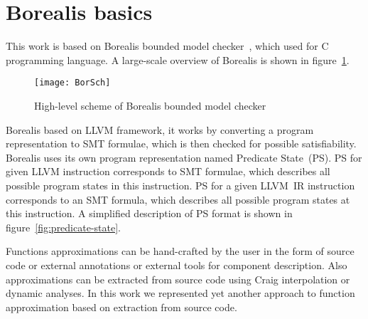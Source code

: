 \section{Borealis basics}\label{sec:basics}

This work is based on Borealis bounded model checker~\cite{Borealis}, which used for C programming language. A large-scale overview of Borealis is shown in figure~\ref{fig:borealis-scheme}.

\begin{figure}[tbh]
\centering
\caption{High-level scheme of Borealis bounded model checker}
\label{fig:borealis-scheme}
\texttt{[image: BorSch]}
\end{figure}

Borealis based on LLVM \cite{LLVM} framework, it works by converting a program representation to SMT formulae, which is then checked for possible satisfiability. Borealis uses its own program representation named Predicate State~(PS). PS for given LLVM instruction corresponds to SMT formulae, which describes all possible program states in this instruction. PS for a given LLVM~IR instruction corresponds to an SMT formula, which describes all possible program states at this instruction. A simplified description of PS format is shown in figure~\ref{fig:predicate-state}.



Functions approximations can be hand-crafted by the user in the form of source code or external annotations or external tools for component description. Also approximations can be extracted from source code using Craig interpolation or dynamic analyses. In this work we represented yet another approach to function approximation based on extraction from source code.
